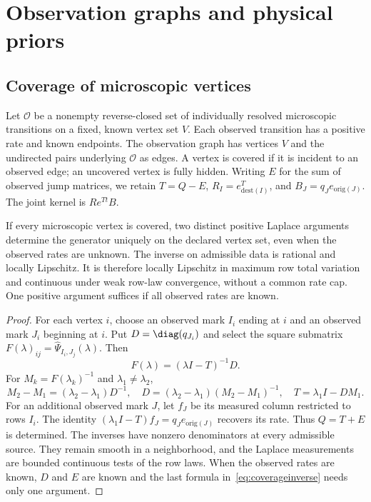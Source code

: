 \section{Observation graphs and physical priors}\label{sec:graphpriors}

\subsection{Coverage of microscopic vertices}
Let $\mathcal O$ be a nonempty reverse-closed set of individually resolved
microscopic transitions on a fixed, known vertex set $V$. Each observed
transition has a positive rate and known endpoints. The observation graph
has vertices $V$ and the undirected pairs underlying $\mathcal O$ as edges.
A vertex is covered if it is incident to an observed edge; an uncovered
vertex is fully hidden. Writing $E$ for the sum of observed jump matrices,
we retain $T=Q-E$, $R_I=e_{\mathrm{dest}(I)}^T$, and
$B_J=q_J e_{\mathrm{orig}(J)}$. The joint kernel is $Re^{Tt}B$.

\begin{proposition}\label{prop:coverage}
If every microscopic vertex is covered, two distinct positive Laplace
arguments determine the generator uniquely on the declared vertex set,
even when the observed rates are unknown. The inverse on admissible data
is rational and locally Lipschitz. It is therefore locally Lipschitz in
maximum row total variation and continuous under weak row-law convergence,
without a common rate cap. One positive argument suffices if all observed
rates are known.
\end{proposition}
\begin{proof}
For each vertex $i$, choose an observed mark $I_i$ ending at $i$ and an
observed mark $J_i$ beginning at $i$. Put $D=\diag(q_{J_i})$ and select
the square submatrix $F(\lambda)_{ij}=\widehat\Psi_{I_i,J_j}(\lambda)$.
Then
\begin{equation}
 F(\lambda)=(\lambda I-T)^{-1}D.
\end{equation}
For $M_k=F(\lambda_k)^{-1}$ and $\lambda_1\ne\lambda_2$,
\begin{equation}
 M_2-M_1=(\lambda_2-\lambda_1)D^{-1},\quad
 D=(\lambda_2-\lambda_1)(M_2-M_1)^{-1},\quad
 T=\lambda_1 I-DM_1.\label{eq:coverageinverse}
\end{equation}
For an additional observed mark $J$, let $f_J$ be its measured column
restricted to rows $I_i$. The identity
$(\lambda_1I-T)f_J=q_J e_{\mathrm{orig}(J)}$ recovers its rate.
Thus $Q=T+E$ is determined. The inverses have nonzero denominators at
every admissible source. They remain smooth in a neighborhood, and the
Laplace measurements are bounded continuous tests of the row laws.
When the observed rates are known, $D$ and $E$ are known and the last
formula in~\eqref{eq:coverageinverse} needs only one argument.
\end{proof}

